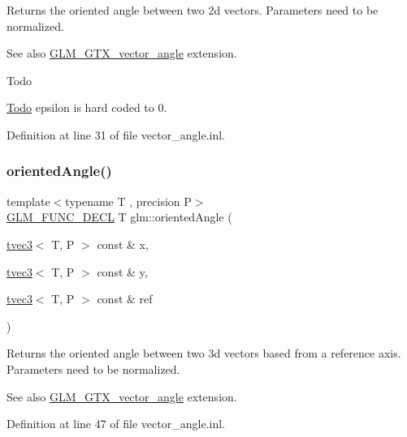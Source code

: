 Returns the oriented angle between two 2d vectors. Parameters need to be normalized. \begin{DoxySeeAlso}{See also}
\mbox{\hyperlink{group__gtx__vector__angle}{G\+L\+M\+\_\+\+G\+T\+X\+\_\+vector\+\_\+angle}} extension.
\end{DoxySeeAlso}
\begin{DoxyRefDesc}{Todo}
\item[\mbox{\hyperlink{todo__todo000001}{Todo}}]epsilon is hard coded to 0. \end{DoxyRefDesc}


Definition at line 31 of file vector\+\_\+angle.\+inl.

\mbox{\label{group__gtx__vector__angle_ga7254dba112eff55f55f9544f41cb9ece}} 
\subsubsection{\texorpdfstring{orientedAngle()}{orientedAngle()}\hspace{0.1cm}{\footnotesize\ttfamily [2/2]}}
{\footnotesize\ttfamily template$<$typename T , precision P$>$ \\
\mbox{\hyperlink{setup_8hpp_ab2d052de21a70539923e9bcbf6e83a51}{G\+L\+M\+\_\+\+F\+U\+N\+C\+\_\+\+D\+E\+CL}} T glm\+::oriented\+Angle (\begin{DoxyParamCaption}\item[{\mbox{\hyperlink{structglm_1_1tvec3}{tvec3}}$<$ T, P $>$ const \&}]{x,  }\item[{\mbox{\hyperlink{structglm_1_1tvec3}{tvec3}}$<$ T, P $>$ const \&}]{y,  }\item[{\mbox{\hyperlink{structglm_1_1tvec3}{tvec3}}$<$ T, P $>$ const \&}]{ref }\end{DoxyParamCaption})}

Returns the oriented angle between two 3d vectors based from a reference axis. Parameters need to be normalized. \begin{DoxySeeAlso}{See also}
\mbox{\hyperlink{group__gtx__vector__angle}{G\+L\+M\+\_\+\+G\+T\+X\+\_\+vector\+\_\+angle}} extension. 
\end{DoxySeeAlso}


Definition at line 47 of file vector\+\_\+angle.\+inl.

